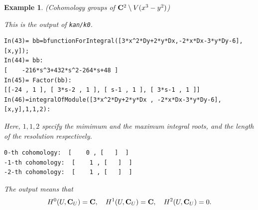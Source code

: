 \documentclass[12pt]{article}
\def\C{{\bf C}}
\newtheorem{example}{Example}[section]
\begin{document}
\begin{example} \rm
(Cohomology groups of $\C^2 \setminus V(x^3-y^2)$)

This is the output of {\tt kan/k0}.
\begin{verbatim}
In(43)= bb=bfunctionForIntegral([3*x^2*Dy+2*y*Dx,-2*x*Dx-3*y*Dy-6],[x,y]);
In(44)= bb:
[    -216*s^3+432*s^2-264*s+48 ] 
In(45)= Factor(bb):
[[-24 , 1 ], [ 3*s-2 , 1 ], [ s-1 , 1 ], [ 3*s-1 , 1 ]] 
In(46)=integralOfModule([3*x^2*Dy+2*y*Dx , -2*x*Dx-3*y*Dy-6],[x,y],1,1,2):
\end{verbatim}
Here, $1,1,2$ specify the mimimum and the maximum integral roots, and 
the length of the resolution respectively.
\begin{verbatim}
0-th cohomology:  [    0 , [   ]  ] 
-1-th cohomology:  [    1 , [   ]  ] 
-2-th cohomology:  [    1 , [   ]  ] 
\end{verbatim}
The output means that
$$ H^0(U,\C_U) = \C, \quad H^1(U,\C_U) = \C, \quad H^2(U,\C_U) = 0.$$


\end{example}
\end{document}

